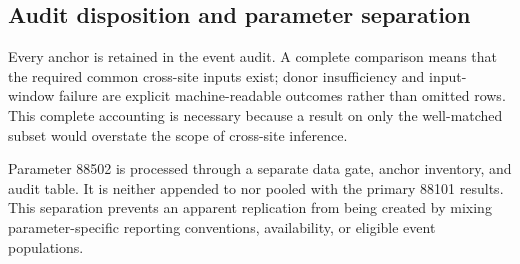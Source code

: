 \subsection{Audit disposition and parameter separation}

Every anchor is retained in the event audit. A complete comparison means that
the required common cross-site inputs exist; donor insufficiency and
input-window failure are explicit machine-readable outcomes rather than omitted
rows. This complete accounting is necessary because a result on only the
well-matched subset would overstate the scope of cross-site inference.

Parameter 88502 is processed through a separate data gate, anchor inventory,
and audit table. It is neither appended to nor pooled with the primary 88101
results. This separation prevents an apparent replication from being created by
mixing parameter-specific reporting conventions, availability, or eligible
event populations.
